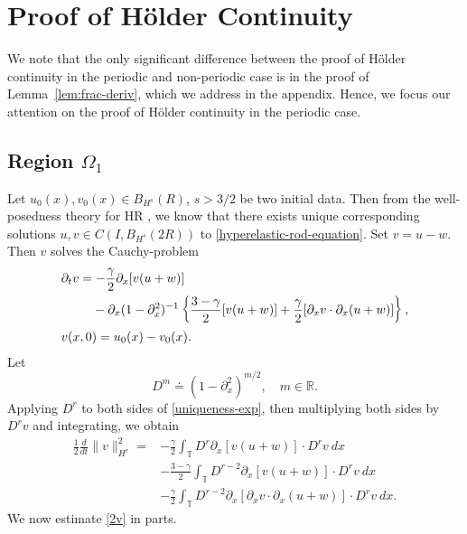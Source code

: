 \documentclass[12pt,reqno]{amsart}
\numberwithin{equation}{section}  %
\numberwithin{figure}{section}
\newcommand{\rr}{\mathbb{R}}
\newcommand{\ci}{\mathbb{T}}
\newcommand{\p}{\partial}
\begin{document}
\section{Proof of H\"older Continuity}
%
We note that the only significant difference between the proof of H\"older
continuity in the periodic and non-periodic case is in the proof of Lemma~\ref{lem:frac-deriv}, which we address in the appendix. Hence, we focus our
attention on the proof of H\"older continuity in the periodic case. 
%
%
\subsection{Region $\Omega_{1}$} 
\label{ssec:reg-m-imp}
%
%
Let $u_{0}(x), v_{0}(x)
\in B_{H^{s}}(R)$, $s > 3/2$ be two initial data. Then from
the well-posedness theory for HR \cite{Karapetyan:2010fk}, we
know that there exists unique corresponding solutions $u, v \in C(I,
B_{H^{s}}(2R))$ to \eqref{hyperelastic-rod-equation}.
Set $v=u-w$. Then $v$ solves the Cauchy-problem
%
%
\begin{align}
\label{uniqueness-exp}
& \p_t v
=  -\frac{\gamma}{2} \p_x [v(u + w)] 
\\
\notag
& \phantom{\p_t v = }-\p_x (1 - \p_{x}^{2})^{-1} \left\{
\frac{3-\gamma}{2}[v(u+w)] + \frac{\gamma}{2}[\p_x v \cdot \p_x (u+w)]
\right\},
\\
& v(x,0) = u_{0}(x) - v_{0}(x).
\label{uniqueness-init-data}
\end{align}
%
%
%
Let
\begin{equation*}
D^{m} \doteq (1 - \p_x^2)^{m/2}, \quad m \in \rr.
\end{equation*}
%
Applying $D^r$ to both sides of \eqref{uniqueness-exp}, then 
multiplying both sides by $D^r v$ and integrating, we obtain
%
%
\begin{equation}
\begin{split}
\frac{1}{2} \frac{d}{dt} \|v\|_{H^r}^2
= & -\frac{\gamma}{2} \int_{\ci} D^r \p_x [v(u+w)] \cdot
D^r v \ dx
\\
& - \frac{3-\gamma}{2} \int_{\ci}  D^{r -2}
\p_x[v(u+w)] \cdot
D^r v \ dx  
\\
& - \frac{\gamma}{2} \int_{\ci} D^{r 
-2} \p_x [ \p_x v
\cdot \p_x (u+w)]\cdot D^r v \ dx.
\label{2v}
\end{split}
\end{equation}
We now estimate \eqref{2v} in parts.
%
\end{document}
